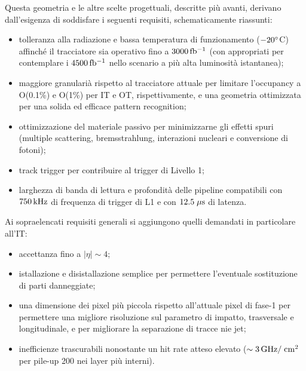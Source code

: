 Questa geometria e le altre scelte progettuali, descritte pi\`u avanti, derivano dall'esigenza di soddisfare i seguenti requisiti, schematicamente riassunti:
\begin{itemize}
\item tolleranza alla radiazione e bassa temperatura di funzionamento ($-20^\circ$C) affinch\'e il tracciatore sia operativo fino a $3000{\rm \, fb^{-1}}$ (con appropriati per contemplare i $4500{\rm \, fb^{-1}}$ nello scenario a pi\`u alta luminosit\`a istantanea);
\item maggiore granulari\`a rispetto al tracciatore attuale per limitare l'occupancy a O(0.1\%) e O(1\%) per IT e OT, rispettivamente, e una geometria ottimizzata per una solida ed efficace pattern recognition; 
\item ottimizzazione del materiale passivo per minimizzarne gli effetti spuri (multiple scattering, bremsstrahlung, interazioni nucleari e conversione di fotoni);
\item track trigger per contribuire al trigger di Livello 1;
\item larghezza di banda di lettura e profondit\`a delle pipeline compatibili con $750{\rm \, kHz}$ di frequenza di trigger di L1 e con $12.5\; \mu \rm s$ di latenza.
\end{itemize}
Ai sopraelencati requisiti generali si aggiungono quelli demandati in particolare all'IT:
\begin{itemize}
\item accettanza fino a $|\eta|\sim4$;
\item istallazione e disistallazione semplice per permettere l'eventuale sostituzione di parti danneggiate;
\item una dimensione dei pixel pi\`u piccola rispetto all'attuale pixel di fase-1 per permettere una migliore risoluzione sul parametro di impatto, trasversale e longitudinale, e per migliorare la separazione di tracce nie jet;
\item inefficienze trascurabili nonostante un hit rate atteso elevato ($\sim 3{\rm \, GHz}/\rm \; cm^2$ per pile-up 200 nei layer pi\`u interni).
\end{itemize}

